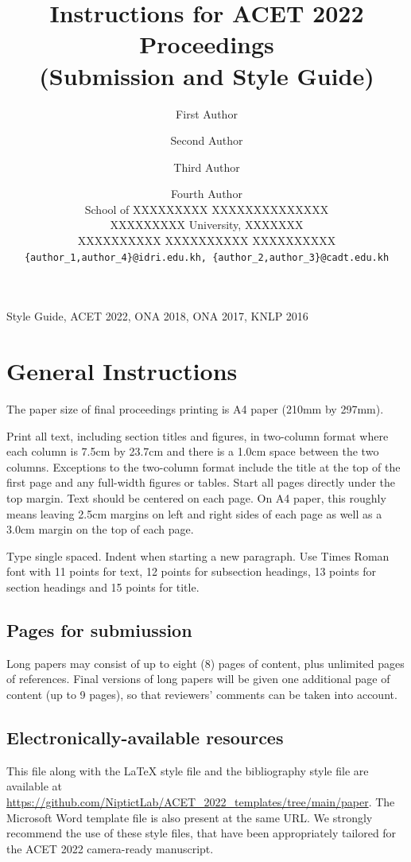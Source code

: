 \documentclass[11pt,a4paper]{article}
\title{Instructions for ACET 2022 Proceedings\\(Submission and Style Guide)}
\author{First Author\affilA \and Second Author\affilB \and Third Author\affilB \and Fourth Author\affilA\\
\affilA School of XXXXXXXXX  XXXXXXXXXXXXXX \\
XXXXXXXXX University, XXXXXXX \\
\affilB XXXXXXXXXX XXXXXXXXXX XXXXXXXXXX \\
{\tt \{author\_1,author\_4\}@idri.edu.kh,  \{author\_2,author\_3\}@cadt.edu.kh}}
\begin{document}
\maketitle

\medskip
{} Style Guide, ACET 2022, ONA 2018, ONA 2017, KNLP 2016

\section{General Instructions}

The paper size of final proceedings printing is A4 paper (210mm by
297mm).

Print all text, including section titles and figures, in two-column
format where each column is 7.5cm by 23.7cm and there is a 1.0cm space
between the two columns.  Exceptions to the two-column format include
the title at the top of the first page and any full-width figures or
tables.  Start all pages directly under the top margin.  Text should be
centered on each page.  On A4 paper, this roughly means leaving 2.5cm
margins on left and right sides of each page as well as a 3.0cm margin
on the top of each page.

Type single spaced.  Indent when starting a new paragraph.  Use Times
Roman font with 11 points for text, 12 points for subsection headings,
13 points for section headings and 15 points for title.

\subsection{Pages for submiussion}

Long papers may consist of up to eight (8) pages of content, plus unlimited pages of references. Final versions of long papers will be given one additional page of content (up to 9 pages), so that reviewers’ comments can be taken into account.

\subsection{Electronically-available resources}

This file along with the \LaTeX{} style file and the bibliography style
file are available at \url{https://github.com/NiptictLab/ACET_2022_templates/tree/main/paper}.  The
Microsoft Word template file is also present at the same URL.  We
strongly recommend the use of these style files, that have been
appropriately tailored for the ACET 2022 camera-ready manuscript.
\end{document}
